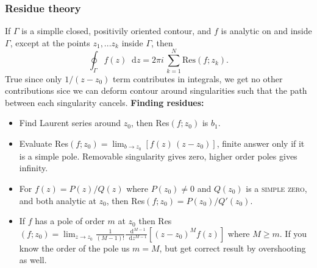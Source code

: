 \documentclass[a4paper, 10pt]{article}
\newcommand*\diff{\mathop{}\!\mathrm{d}}
\begin{document}
\begin{multicols*}{3}
\subsubsection*{Residue theory}
If $\Gamma$ is a simplle closed, positivily oriented contour, and $f$ is analytic on and inside $\Gamma$, except at the points $z_1,...z_k$ inside $\Gamma$, then
\begin{equation}
  \oint_{\Gamma} f(z) \diff z = 2\pi i\, \sum_{k=1}^{N} \text{Res}(f;z_k).
\end{equation}
True since only $1/(z-z_0)$ term contributes in integrals, we get no other contributions sice we can deform contour around singularities such that the path between each singularity cancels.
\textbf{Finding residues:}
\begin{itemize}
  \item Find Laurent series around $z_0$, then Res$(f;z_0)$ is $b_1$.
  \item Evaluate Res$(f;z_0)=\lim_{b\rightarrow z_0} \left[f(z)\,(z-z_0)\right]$, finite answer only if it is a simple pole. Removable singularity gives zero, higher order poles gives infinity.
  \item For $f(z)=P(z)/Q(z)$ where $P(z_0)\neq 0$ and $Q(z_0)$ is a \textsc{simple zero}, and both analytic at $z_0$, then Res$(f;z_0)=P(z_0)/Q'(z_0)$.
  \item If $f$ has a pole of order $m$ at $z_0$ then Res$(f;z_0) = \lim_{z\rightarrow z_0} \frac{1}{(M-1)!}\frac{\diff^{M-1}}{\diff z^{M-1}}\left[(z-z_0)^Mf(z)\right]$ where $M \geq m$. If you know the order of the pole us $m=M$, but get correct result by overshooting as well.
\end{itemize}

\end{multicols*}
\end{document}
